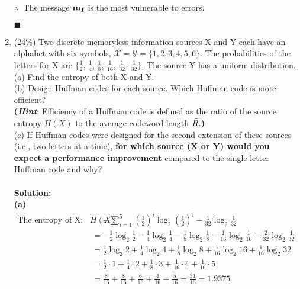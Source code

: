 \documentclass[a4paper,12pt]{article}
\begin{document}
\begin{enumerate}
            $\therefore \;$ The message $\bf{m_1}$ is the most vulnerable to errors.
            \begin{flushright}
                $\blacksquare$
            \end{flushright}
        \item (24\%)
            Two discrete memoryless information sources X and Y each have an alphabet with six symbols, $\mathcal{X} = \mathcal{Y} = \{ 1, 2, 3, 4, 5, 6 \}$. The probabilities of the letters for X are $\{ \frac{1}{2}$, $\frac{1}{4}$, $\frac{1}{8}$, $\frac{1}{16}$, $\frac{1}{32}$, $\frac{1}{32} \}$. The source Y has a uniform distribution. \\ 
            (a) Find the entropy of both X and Y. \\ 
            (b) Design Huffman codes for each source. Which Huffman code is more efficient? \\
            \textbf{(\textit{Hint}}: Efficiency of a Huffman code is defined as the ratio of the source entropy $H(X)$ to the average codeword length $\Bar{R}$.\textbf{)} \\
            (c) If Huffman codes were designed for the second extension of these sources (i.e., two letters at a time), \textbf{for which source (X or Y) would you expect a performance improvement} compared to the single-letter Huffman code and why? \\ \\
            \textbf{Solution:} \\ 
            \textbf{(a)} 
            \begin{align*}
                \text{The entropy of X:} \;\;\; 
                H(X) &= -\sum_{i = 1}^{5} (\frac{1}{2})^i \log_2 (\frac{1}{2})^i - \frac{1}{32} \log_2 \frac{1}{32} \\
                &= -\frac{1}{2} \log_2 \frac{1}{2} -\frac{1}{4} \log_2 \frac{1}{4} -\frac{1}{8} \log_2 \frac{1}{8} -\frac{1}{16} \log_2 \frac{1}{16} -\frac{2}{32} \log_2 \frac{1}{32} \\
                &= \frac{1}{2} \log_2 2 + \frac{1}{4} \log_2 4 + \frac{1}{8} \log_2 8 + \frac{1}{16} \log_2 16 + \frac{1}{16} \log_2 32 \\ 
                &= \frac{1}{2} \cdot 1 + \frac{1}{4} \cdot 2 + \frac{1}{8} \cdot 3 + \frac{1}{16} \cdot 4 + \frac{1}{16} \cdot 5 \\ 
                &= \frac{8}{16} + \frac{8}{16} + \frac{6}{16} + \frac{4}{16} + \frac{5}{16} = \frac{31}{16} = 1.9375 \\ 

\end{align*}
\end{enumerate}
\end{document}
